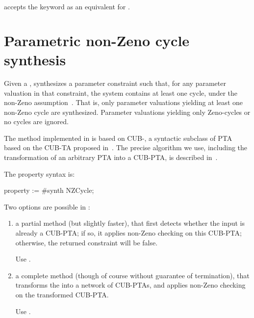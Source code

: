 \begin{syntaxalias}
	\imitator{} accepts the  keyword as an equivalent for .
\end{syntaxalias}



\section{Parametric non-Zeno cycle synthesis}\label{section:algorithm:Zeno}

Given a \NIPTA{}, \imitator{} synthesizes a parameter constraint such that, for any parameter valuation in that constraint, the system contains at least one cycle, under the non-Zeno assumption~\cite{ANPS17}.
That is, only parameter valuations yielding at least one non-Zeno cycle are synthesized.
Parameter valuations yielding only Zeno-cycles or no cycles are ignored.

The method implemented in \imitator{} is based on CUB-\IPTA{}, a syntactic subclass of PTA based on the CUB-TA proposed in~\cite{WSWLSDYL15}.
The precise algorithm we use, including the transformation of an arbitrary PTA into a CUB-PTA, is described in~\cite{ANPS17}.

The property syntax is:

\begin{IMITATORproperty}
property := #synth NZCycle;
\end{IMITATORproperty}

Two options are possible in \imitator{}:
\begin{enumerate}
	\item a partial method (but slightly faster), that first detects whether the input \NIPTA{} is already a CUB-PTA; if so, it applies non-Zeno checking on this CUB-PTA; otherwise, the returned constraint will be false.

	      Use .

	\item a complete method (though of course without guarantee of termination), that transforms the \NIPTA{} into a network of CUB-PTAs, and applies non-Zeno checking on the transformed CUB-PTA.

	      Use .

\end{enumerate}

